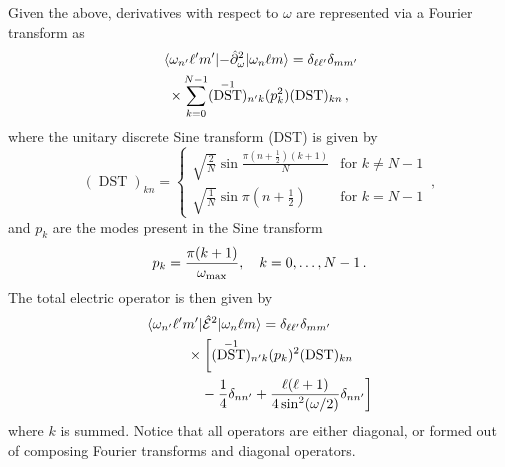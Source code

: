 \documentclass[reprint,superscriptaddress,pra,nofootinbib,preprintnumbers,floatfix]{revtex4-1}
\providecommand{\omMax}{\omega_\mathrm{max}}
\DeclareMathOperator{\DST}{DST}
\begin{document}
Given the above, derivatives with respect to $\omega$ are represented via a Fourier transform as
%
\begin{multline}
\mel{\omega_{n'} \ell' m'}{-\hat{\partial}_\omega^2}{\omega_n \ell m}
 = \delta_{\ell\ell'} \delta_{mm'} \\
\times \sum_{k=0}^{N-1} (\DST^{-1})_{n'k} (p_k^2) (\DST)_{kn}
\,,
\end{multline}
%
where the unitary discrete Sine transform (DST) is given by
\begin{equation}
(\DST)_{kn} = 
\begin{cases}
\sqrt{\frac{2}{N}} \sin\frac{\pi(n+\frac12)(k+1)}{N} & \text{for $k\neq N-1$} \\
\sqrt{\frac{1}{N}}\sin\pi(n+\frac{1}{2})       & \text{for $k=N-1$}
\end{cases}\,,
\end{equation}
%
and $p_k$ are the modes present in the Sine transform
%
\begin{align}
    p_k = \frac{\pi(k+1)}{\omMax} \qc k=0, \dotsc, N-1
    \,.
\end{align}
%
The total electric operator is then given by
%
\begin{align}
&\mel{\omega_{n'} \ell' m'}{\hat{\mathcal{E}}^2}{\omega_n \ell m}
 = \delta_{\ell\ell'} \delta_{mm'} \nonumber \\ 
& \qquad\quad \times \bigg[ (\DST^{-1})_{n'k} (p_k)^2 (\DST)_{kn} \\
& \qquad\qquad - \frac{1}{4}\delta_{nn'}
+ \frac{\ell(\ell+1)}{4\sin^2(\omega/2)}\delta_{nn'}\bigg] \, \nonumber
\end{align}
%
where $k$ is summed. 
%
Notice that all operators are either diagonal, or formed out of composing Fourier transforms and diagonal operators. 
\end{document}
